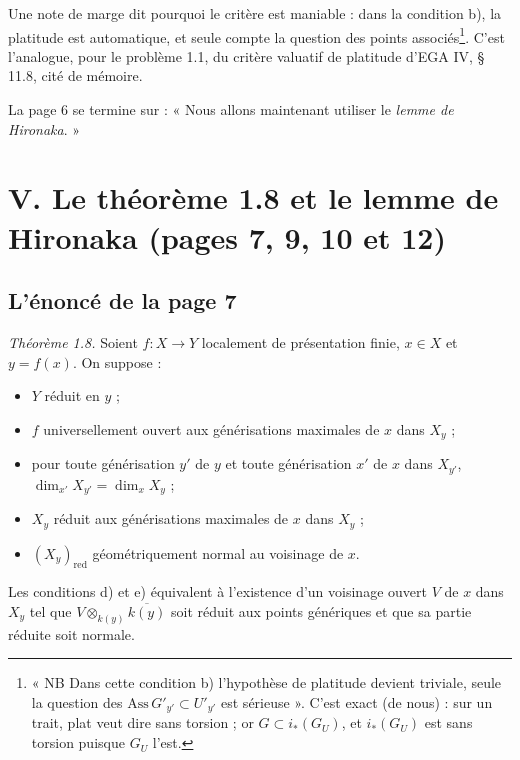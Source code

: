 \documentclass[11pt,a4paper]{article}
\begin{document}
Une note de marge dit pourquoi le critère est maniable : dans la condition b),
la platitude est automatique, et seule compte la question des points
associés\footnote{« NB Dans cette condition b) l'hypothèse de platitude devient
triviale, seule la question des $\mathrm{Ass}\, G'_{y'} \subset U'_{y'}$
est sérieuse ». C'est exact (de nous) : sur un trait, plat veut dire sans torsion ;
or $G \subset i_*(G_U)$, et $i_*(G_U)$ est sans torsion puisque $G_U$
l'est.}. C'est l'analogue, pour le problème 1.1, du critère valuatif de
platitude d'EGA IV, § 11.8, cité de mémoire.

La page 6 se termine sur : « Nous allons maintenant utiliser le \emph{lemme
de Hironaka}. »

\section*{V. Le théorème 1.8 et le lemme de Hironaka (pages 7, 9, 10 et 12)}

\subsection*{L'énoncé de la page 7}

\emph{Théorème 1.8.} Soient $f \colon X \to Y$ localement de présentation
finie, $x \in X$ et $y = f(x)$. On suppose :
\begin{itemize}
  \item[a)] $Y$ réduit en $y$ ;
  \item[b)] $f$ universellement ouvert aux générisations maximales de $x$ dans
  $X_y$ ;
  \item[c)] pour toute générisation $y'$ de $y$ et toute générisation $x'$ de
  $x$ dans $X_{y'}$, $\dim_{x'} X_{y'} = \dim_x X_y$ ;
  \item[d)] $X_y$ réduit aux générisations maximales de $x$ dans $X_y$ ;
  \item[e)] $(X_y)_{\mathrm{red}}$ géométriquement normal au voisinage de $x$.
\end{itemize}
Les conditions d) et e) équivalent à l'existence d'un voisinage ouvert $V$ de
$x$ dans $X_y$ tel que $V \otimes_{k(y)} \overline{k(y)}$ soit réduit aux
points génériques et que sa partie réduite soit normale.
\end{document}
